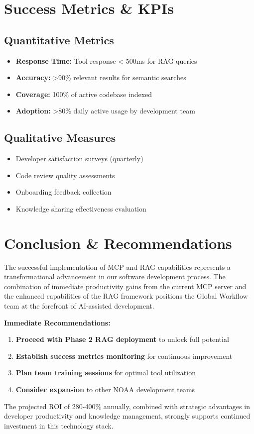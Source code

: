 \documentclass[11pt,letterpaper]{article}
\begin{document}
\section{Success Metrics \& KPIs}

\subsection{Quantitative Metrics}
\begin{itemize}
    \item \textbf{Response Time:} Tool response < 500ms for RAG queries
    \item \textbf{Accuracy:} >90\% relevant results for semantic searches
    \item \textbf{Coverage:} 100\% of active codebase indexed
    \item \textbf{Adoption:} >80\% daily active usage by development team
\end{itemize}

\subsection{Qualitative Measures}
\begin{itemize}
    \item Developer satisfaction surveys (quarterly)
    \item Code review quality assessments
    \item Onboarding feedback collection
    \item Knowledge sharing effectiveness evaluation
\end{itemize}

\section{Conclusion \& Recommendations}

\begin{executivebox}
The successful implementation of MCP and RAG capabilities represents a transformational advancement in our software development process. The combination of immediate productivity gains from the current MCP server and the enhanced capabilities of the RAG framework positions the Global Workflow team at the forefront of AI-assisted development.

\textbf{Immediate Recommendations:}
\begin{enumerate}
    \item \textbf{Proceed with Phase 2 RAG deployment} to unlock full potential
    \item \textbf{Establish success metrics monitoring} for continuous improvement
    \item \textbf{Plan team training sessions} for optimal tool utilization
    \item \textbf{Consider expansion} to other NOAA development teams
\end{enumerate}

The projected ROI of 280-400\% annually, combined with strategic advantages in developer productivity and knowledge management, strongly supports continued investment in this technology stack.
\end{executivebox}
\end{document}
